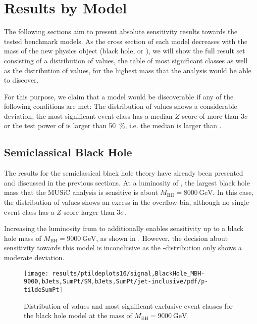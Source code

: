 \section{Results by Model}
\label{sec:results}

The following sections aim to present absolute sensitivity results towards the tested benchmark models. As the cross section of each model decreases with the mass of the new physics object (black hole, \PSigma or \PWprime), we will show the full result set consisting of a distribution of \ptilde values, the table of most significant classes as well as the distribution of \TSphat values, for the highest mass that the analysis would be able to discover. 

For this purpose, we claim that a model would be discoverable if any of the following conditions are met: The distribution of \ptilde values shows a considerable deviation, the most significant event class has a median $Z$-score of more than $\num{3}\sigma$ or the test power of \TSphat is larger than \SI{50}{\percent}, i.e. the median \TSphat is larger than \TSphatcrit.

\subsection{Semiclassical Black Hole}
\label{sec:results_bh}

The results for the semiclassical black hole theory have already been presented and discussed in the previous sections. At a luminosity of \lumiA, the largest black hole mass that the \ac{MUSiC} analysis is sensitive is about $M_\text{BH} = \SI{8000}{\GeV}$. In this case, the distribution of \ptilde values shows an excess in the overflow bin, although no single event class has a $Z$-score larger than $\num{3}\sigma$.

Increasing the luminosity from \lumiA to \lumiB additionally enables sensitivity up to a black hole mass of $M_\text{BH} = \SI{9000}{\GeV}$, as shown in . However, the decision about sensitivity towards this model is inconclusive as the \ptilde-distribution only shows a moderate deviation. 
\begin{figure}
    \centering
    \texttt{[image: results/ptildeplots16/signal,BlackHole\_MBH-9000,bJets,SumPt/SM,bJets,SumPt/jet-inclusive/pdf/p-tildeSumPt]}
    {
        
    }
    \caption{Distribution of \ptilde values and most significant exclusive event classes for the black hole model at the mass of $M_\text{BH} = \SI{9000}{\GeV}$.}
    \label{fig:result_bh_9000}
\end{figure}

